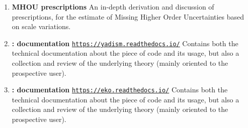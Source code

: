 \documentclass[10pt, a4paper, sans]{moderncv}
\newcommand{\tturl}[1]{\texttt{\url{#1}}}
\begin{document}
\begin{multicols}{2}
\begin{enumerate}
    \item \textbf{MHOU prescriptions}
      \newline
      An in-depth derivation and discussion of prescriptions, for the estimate
      of Missing Higher Order Uncertainties based on scale variations.
    \item \textbf{\yadism: documentation}
      \newline
      \tturl{https://yadism.readthedocs.io/}
      \newline
      Contains both the technical documentation about the piece of code and its
      usage, but also a collection and review of the underlying theory (mainly
      oriented to the prospective user).
    \item \textbf{\eko: documentation}
      \newline
      \tturl{https://eko.readthedocs.io/}
      \newline
      Contains both the technical documentation about the piece of code and its
      usage, but also a collection and review of the underlying theory (mainly
      oriented to the prospective user).
\end{enumerate}

\columnbreak
\vspace*{\textheight}

\end{multicols}
\end{document}
